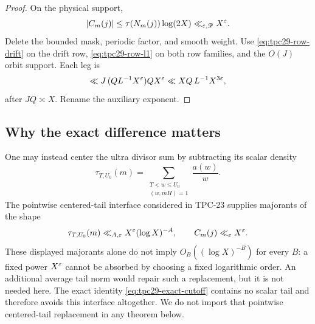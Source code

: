\begin{proof}
On the physical support,
\begin{equation}
 |C_m(j)|
 \le \tau(N_m(j))\log(2X)
 \ll_{\varepsilon,\mathscr D}X^\varepsilon.
 \label{eq:tpc29-ultra-pointwise}
\end{equation}
Delete the bounded mask, periodic factor, and smooth weight.  Use
\eqref{eq:tpc29-row-drift} on the drift row,
\eqref{eq:tpc29-row-l1} on both row families, and the $O(J)$ orbit
support.  Each leg is
\[
 \ll J\,(QL^{-1}X^\varepsilon)QX^\varepsilon
 \ll XQ\,L^{-1}X^{3\varepsilon},
\]
after $JQ\asymp X$.  Rename the auxiliary exponent.
\end{proof}

\subsection{Why the exact difference matters}

One may instead center the ultra divisor sum by subtracting its scalar
density
\begin{equation}
 \tau_{T,U_0}(m)
 =\sum_{\substack{T<w\le U_0\\(w,mH)=1}}\frac{a(w)}w.
 \label{eq:tpc29-scalar-tail}
\end{equation}
The pointwise centered-tail interface considered in TPC-23
\citep{WangTPC23} supplies majorants of the shape
\begin{equation}
 \tau_{T,U_0}(m)\ll_{A,\varepsilon}X^\varepsilon(\log X)^{-A},
 \qquad
 C_m(j)\ll_\varepsilon X^\varepsilon.
 \label{eq:tpc29-insufficient-pointwise-pair}
\end{equation}
These displayed majorants alone do not imply
$O_B((\log X)^{-B})$ for every $B$: a fixed power $X^\varepsilon$ cannot be
absorbed by choosing a fixed logarithmic order.  An additional average
tail norm would repair such a replacement, but it is not needed here.
The exact identity \eqref{eq:tpc29-exact-cutoff} contains no scalar
tail and therefore avoids this interface altogether.  We do not
import that pointwise centered-tail replacement in any theorem below.
